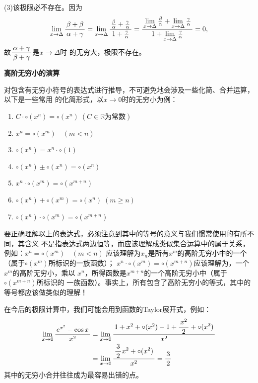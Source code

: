 (3)该极限必不存在。因为
\begin{align*}
	\lim\limits_{x\to{\Delta}}\displaystyle\frac{\,{\beta+\beta}\,}{\,{\alpha+\gamma}\,}
	=\lim\limits_{x\to{\Delta}}\displaystyle\frac{\,{\frac{\beta}{\alpha}+\frac{\gamma}{\alpha}}\,}{\,{1+\frac{\gamma}{\alpha}}\,}
	=\displaystyle\frac{\,{\lim\limits_{x\to{\Delta}}\frac{\beta}{\alpha}
	+\lim\limits_{x\to{\Delta}}\frac{\gamma}{\alpha}}\,}{\,{1+\lim\limits_{x\to{\Delta}}\frac{\gamma}{\alpha}}\,}
	=0,
\end{align*}
故$\displaystyle\frac{\,{\alpha+\gamma}\,}{\,{\beta+\gamma}\,}$是$x\to\Delta$时
的无穷大，极限不存在。
\fin

\begin{shaded}
	{\bf 高阶无穷小的演算}
	
	对包含有无穷小符号的表达式进行推导，不可避免地会涉及一些化简、合并运算，以下是一些常用
	的化简形式，以$x\to 0$时的无穷小为例：
	\begin{tcolorbox}
		\begin{enumerate}[(1)]
	  	  \item $C\cdot\circ(x^n)=\circ(x^n)\;(C\in\mathbb{R}\mbox{为常数})$
		  \item $x^n=\circ(x^m)\quad (m<n)$ 
		  \item $\circ(x^n)=x^n\cdot\circ(1)$
		  \item $\circ(x^n)\pm\circ(x^n)=\circ(x^n)$
		  \item $x^n\cdot\circ(x^m)=\circ(x^{m+n})$ 
		  \item $\circ(x^n)+\circ(x^m)=\circ(x^n)\;(m\geq n)$  
		  \item $\circ(x^n)\cdot\circ(x^m)=\circ(x^{m+n})$
		\end{enumerate}
	\end{tcolorbox}
	要正确理解以上的表达式，必须注意到其中的等号的意义与我们惯常使用的有所不同，其含义
	不是指表达式两边恒等，而应该理解成类似集合运算中的属于关系，例如：$x^n=\circ(x^m)\quad (m<n)$ 
	应该理解为$x_n$是所有$x^m$的高阶无穷小中的一个（属于$\circ(x^m)$所标识的一族函数）；
	$x^n\cdot\circ(x^m)=\circ(x^{m+n})$应该理解为，一个$x^m$的高阶无穷小，乘以
	$x^n$，所得函数是$x^{m+n}$的一个高阶无穷小中（属于$\circ(x^{m+n})$所标识的
	一族函数）。事实上，所有包含了高阶无穷小的等式，其中的等号都应该做类似的理解！
	
	在今后的极限计算中，我们可能会用到函数的Taylor展开式，例如：
	\begin{align}
		\lim\limits_{x\to{0}}\displaystyle\frac{\,{e^{x^2}-\cos x}\,}{\,{x^2}\,}&=\lim\limits_{x\to{0}}
		\displaystyle\frac{\,{1+x^2+\circ(x^2)-1+\displaystyle\frac{\,{x^2}\,}{\,{2}\,}+\circ(x^2)}\,}{\,{x^2}\,}\notag\\
		&=\lim\limits_{x\to{0}}\displaystyle\frac{\,{\displaystyle\frac{\,{3}\,}{\,{2}\,}x^2+\circ(x^2)}\,}{\,{x^2}\,}=\displaystyle\frac{\,{3}\,}{\,{2}\,}\notag
	\end{align}
	其中的无穷小合并往往成为最容易出错的点。
\end{shaded}

